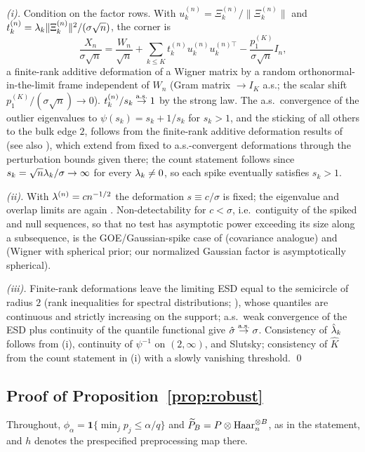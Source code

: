 \emph{(i).} Condition on the factor rows. With
$u_k^{(n)}=\Xi_k^{(n)}/\lVert\Xi_k^{(n)}\rVert$ and
$t_k^{(n)}=\lambda_k\lVert\Xi_k^{(n)}\rVert^2/(\sigma\sqrt n)$, the corner is
\[
\frac{X_n}{\sigma\sqrt n}
=\frac{W_n}{\sqrt n}
+\sum_{k\le K} t^{(n)}_k u^{(n)}_ku^{(n)\top}_k
-\frac{p_1^{(K)}}{\sigma\sqrt n}I_n ,
\]
a finite-rank additive deformation of a Wigner matrix by a random
orthonormal-in-the-limit frame independent of $W_n$ (Gram matrix
$\to I_K$ a.s.; the scalar shift $p_1^{(K)}/(\sigma\sqrt n)\to0$).
$t^{(n)}_k/s_k\overset{\mathrm{a.s.}}{\to}1$ by the strong law. The a.s.\ convergence of the
outlier eigenvalues to $\psi(s_k)=s_k+1/s_k$ for $s_k>1$, and the sticking
of all others to the bulk edge $2$, follows from the finite-rank additive deformation results of
\citet{benaych2011eigenvalues} (see also
\citealp{feral2007largest,capitaine2009largest}), which extend from
fixed to a.s.-convergent deformations through the perturbation bounds
given there; the count
statement follows since $s_k=\sqrt n\lambda_k/\sigma\to\infty$ for every
$\lambda_k\ne0$, so each spike eventually satisfies $s_k>1$.

\emph{(ii).} With $\lambda^{(n)}=cn^{-1/2}$ the deformation
$s\equiv c/\sigma$ is fixed; the eigenvalue and overlap limits are again
\citet{benaych2011eigenvalues}. Non-detectability for $c<\sigma$, i.e.\ contiguity of the spiked and null
sequences, so that no test has asymptotic power exceeding its size along a
subsequence, is the
GOE/Gaussian-spike case of \citet{onatski2013asymptotic} (covariance
analogue) and \citet[Thm.~1.5ff.]{perry2018optimality} (Wigner with
spherical prior; our normalized Gaussian factor is asymptotically
spherical).

\emph{(iii).} Finite-rank deformations leave the limiting ESD equal to
the semicircle of radius $2$ (rank inequalities for spectral
distributions; \citealp{bai2008central}), whose quantiles are continuous
and strictly increasing on the support; a.s.\ weak convergence of the ESD
plus continuity of the quantile functional give
$\hat\sigma\overset{\mathrm{a.s.}}{\to}\sigma$. Consistency of $\hat{\lambda}_k$ follows from (i),
continuity of $\psi^{-1}$ on $(2,\infty)$, and Slutsky; consistency of
$\hat K$ from the count statement in (i) with a slowly vanishing
threshold. \qed

\subsection{Proof of Proposition~\ref{prop:robust}}

Throughout, $\phi_\alpha=\mathbf 1\{\min_jp_j\le\alpha/q\}$ and
$\widetilde P_B=P\otimes\mathrm{Haar}_n^{\otimes B}$, as in the statement, and
$h$ denotes the prespecified preprocessing map there.

